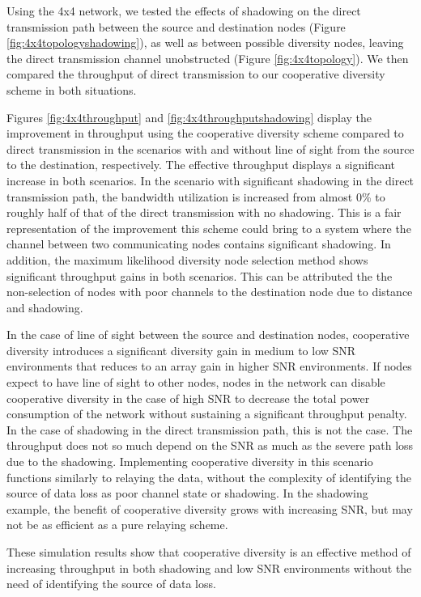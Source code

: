 Using the 4x4 network, we tested the effects of shadowing on the direct transmission path between the source and destination nodes (Figure \ref{fig:4x4topologyshadowing}), as well as between possible diversity nodes, leaving the direct transmission channel unobstructed (Figure \ref{fig:4x4topology}).
We then compared the throughput of direct transmission to our cooperative diversity scheme in both situations.

Figures \ref{fig:4x4throughput} and \ref{fig:4x4throughputshadowing} display the improvement in throughput using the cooperative diversity scheme compared to direct transmission in the scenarios with and without line of sight from the source to the destination, respectively.
The effective throughput displays a significant increase in both scenarios.
In the scenario with significant shadowing in the direct transmission path, the bandwidth utilization is increased from almost 0\% to roughly half of that of the direct transmission with no shadowing.
This is a fair representation of the improvement this scheme could bring to a system where the channel between two communicating nodes contains significant shadowing.
In addition, the maximum likelihood diversity node selection method shows significant throughput gains in both scenarios.  This can be attributed the the non-selection of nodes with poor channels to the destination node due to distance and shadowing.


In the case of line of sight between the source and destination nodes, cooperative diversity introduces a significant diversity gain in medium to low SNR environments that reduces to an array gain in higher SNR environments.
If nodes expect to have line of sight to other nodes, nodes in the network can disable cooperative diversity in the case of high SNR to decrease the total power consumption of the network without sustaining a significant throughput penalty.
In the case of shadowing in the direct transmission path, this is not the case.
The throughput does not so much depend on the SNR as much as the severe path loss due to the shadowing.
Implementing cooperative diversity in this scenario functions similarly to relaying the data, without the complexity of identifying the source of data loss as poor channel state or shadowing.
In the shadowing example, the benefit of cooperative diversity grows with increasing SNR, but may not be as efficient as a pure relaying scheme.

These simulation results show that cooperative diversity is an effective method of increasing throughput in both shadowing and low SNR environments without the need of identifying the source of data loss.